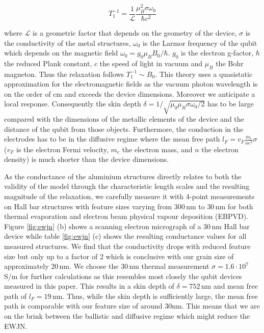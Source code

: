 \documentclass[%
 reprint,
 amsmath,amssymb,
 aps,
]{revtex4-1}
\begin{document}
\begin{equation}
T_1^{-1}=\frac{1}{\mathcal{L}}\frac{\mu_B^2\sigma\omega_0}{\hbar c^2}
\end{equation}

where $\mathcal{L}$ is a geometric factor that depends on the geometry of the device, $\sigma$ is the conductivity of the metal structures, $\omega_0$ is the Larmor frequency of the qubit which depends on the magnetic field $\omega_0=g_0\mu_B B_0/\hbar$. $g_0$ is the electron g-factor, $\hbar$ the reduced Plank constant, $c$ the speed of light in vacuum and $\mu_B$ the Bohr magneton. Thus the relaxation follows $T_1^{-1}\sim B_0$. This theory uses a quasistatic approximation for the electromagnetic fields as the vacuum photon wavelength is on the order of cm and exceeds the device dimensions. Moreover we anticipate a local response. Consequently the skin depth $\delta=1/\sqrt{\mu_0\mu_R\sigma\omega_0/2}$ has to be large compared with the dimensions of the metallic elements of the device and the distance of the qubit from those objects. Furthermore, the conduction in the electrodes has to be in the diffusive regime where the mean free path $l_F=v_F\frac{m_e}{ne^2}\sigma$ ($v_F$ is the electron Fermi velocity, $m_e$ the electron mass, and $n$ the electron density) is much shorter than the device dimensions.  

As the conductance of the aluminium structures directly relates to both the validity of the model through the characteristic length scales and the resulting magnitude of the relaxation, we carefully measure it with 4-point measurements on Hall bar structures with feature sizes varying from $300\,$nm to $30\,$nm for both thermal evaporation and electron beam physical vapour deposition (EBPVD). Figure \ref{fig:ewjn} (b) shows a scanning electron micrograph of a $30\,$nm Hall bar device while table \ref{fig:ewjn} (c) shows the resulting conductance values for all measured structures. 
We find that the conductivity drops with reduced feature size but only up to a factor of 2 which is conclusive with our grain size of approximately $20\,$nm.  We choose the $30\,$nm thermal measurement $\sigma=1.6\cdot 10^7\,$S/m for further calculations as this resembles most closely the qubit devices measured in this paper. This results in a skin depth of $\delta=752\,$nm and mean free path of $l_F=19\,$nm. Thus, while the skin depth is sufficiently large, the mean free path is comparable with our feature size of around 30nm. This means that we are on the brink between the ballistic and diffusive regime which might reduce the EWJN.
\end{document}
